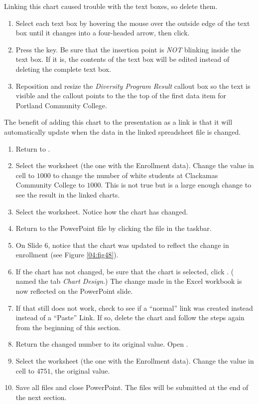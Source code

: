Linking this chart caused trouble with the text boxes, so delete them.

\begin{enumerate}
	\item Select each text box by hovering the mouse over the outside edge of the text box until it changes into a four-headed arrow, then click.
	\item Press the  key. Be sure that the insertion point is \textit{NOT} blinking inside the text box. If it is, the contents of the text box will be edited instead of deleting the complete text box.
	\item Reposition and resize the \textit{Diversity Program Result} callout box so the text is visible and the callout points to the the top of the first data item for Portland Community College.
\end{enumerate}

The benefit of adding this chart to the presentation as a link is that it will automatically update when the data in the linked spreadsheet file is changed.

\begin{enumerate}
	\item Return to .
	\item Select the  worksheet (the one with the Enrollment data). Change the value in cell  to $ 1000 $ to change the number of white students at Clackamas Community College to $ 1000 $. This is not true but is a large enough change to see the result in the linked charts.
	\item Select the  worksheet. Notice how the chart has changed.
	\item Return to the  PowerPoint file by clicking the file in the taskbar.
	\item On Slide $ 6 $, notice that the chart was updated to reflect the change in enrollment (see Figure \ref{04:fig48}).
	\item If the chart has not changed, be sure that the chart is selected, click . ( named the tab \textit{Chart Design}.) The change made in the Excel workbook is now reflected on the PowerPoint slide.
	\item If that still does not work, check to see if a ``normal'' link was created instead instead of a ``Paste'' Link. If so, delete the chart and follow the steps again from the beginning of this section.
	\item Return the changed number to its original value. Open .
	\item Select the  worksheet (the one with the Enrollment data). Change the value in cell  to $ 4751 $, the original value.
	\item Save all files and close PowerPoint. The files will be submitted at the end of the next section.
\end{enumerate}

